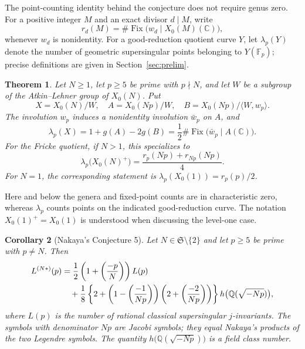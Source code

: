 \documentclass[11pt,a4paper]{article}
\newtheorem{theorem}{Theorem}[section]
\newtheorem{corollary}[theorem]{Corollary}
\theoremstyle{remark}\newtheorem{remark}[theorem]{Remark}
\numberwithin{equation}{section}
\newcommand{\Q}{\mathbb Q}\newcommand{\Z}{\mathbb Z}
\newcommand{\C}{\mathbb C}\newcommand{\Fp}{\mathbb F_p}
\newcommand{\Fix}{\operatorname{Fix}}
\newcommand{\leg}[2]{\left(\frac{#1}{#2}\right)}
\newcommand{\hK}[1]{h\bigl(\Q(\sqrt{-#1})\bigr)}
\begin{document}
	The point-counting identity behind the conjecture does not require genus zero. For a positive integer $M$ and an exact divisor $d\mid M$, write
	\[
	r_d(M)=\#\Fix\bigl(w_d\mid X_0(M)(\C)\bigr),
	\]
	whenever $w_d$ is nonidentity. For a good-reduction quotient curve $Y$, let $\lambda_p(Y)$ denote the number of geometric supersingular points belonging to $Y(\Fp)$; precise definitions are given in Section~\ref{sec:prelim}.
	
	\begin{theorem}\label{thm:main}
		Let $N\geq1$, let $p\geq5$ be prime with $p\nmid N$, and let $W$ be a subgroup of the Atkin--Lehner group of $X_0(N)$. Put
		\[
		X=X_0(N)/W,\quad A=X_0(Np)/W,\quad
		B=X_0(Np)/\langle W,w_p\rangle.
		\]
		The involution $w_p$ induces a nonidentity involution $\bar w_p$ on $A$, and
		\begin{equation}\label{eq:general}
			\lambda_p(X)=1+g(A)-2g(B)
			=\frac12\#\Fix\bigl(\bar w_p\mid A(\C)\bigr).
		\end{equation}
		For the Fricke quotient, if $N>1$, this specializes to
		\begin{equation}\label{eq:fricke}
			\lambda_p\bigl(X_0(N)^+\bigr)
			=\frac{r_p(Np)+r_{Np}(Np)}4.
		\end{equation}
		For $N=1$, the corresponding statement is $\lambda_p(X_0(1))=r_p(p)/2$.
	\end{theorem}
	
	Here and below the genera and fixed-point counts are in characteristic zero, whereas $\lambda_p$ counts points on the indicated good-reduction curve. The notation $X_0(1)^+=X_0(1)$ is understood when discussing the level-one case.
	
	\begin{corollary}[Nakaya's Conjecture 5]\label{cor:nakaya}
		Let $N\in\mathfrak S\setminus\{2\}$ and let $p\geq5$ be prime with $p\ne N$. Then
		\begin{align}
			L^{(N*)}(p)
			&=\frac12\left(1+\leg{-p}{N}\right)L(p)\notag\\
			&\quad+\frac18\left\{2+\left(1-\leg{-1}{Np}\right)
			\left(2+\leg{-2}{Np}\right)\right\}\hK{Np},\label{eq:nakaya}
		\end{align}
		where $L(p)$ is the number of rational classical supersingular $j$-invariants. The symbols with denominator $Np$ are Jacobi symbols; they equal Nakaya's products of the two Legendre symbols. The quantity $\hK{Np}$ is a field class number.
	\end{corollary}
	
\end{document}
